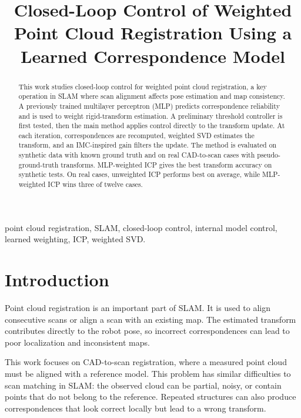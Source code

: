\documentclass[conference]{IEEEtran}
\begin{document}
\title{Closed-Loop Control of Weighted Point Cloud Registration Using a Learned Correspondence Model}

\author{
}

\maketitle

\begin{abstract}
This work studies closed-loop control for weighted point cloud registration, a key operation in SLAM where scan alignment affects pose estimation and map consistency. A previously trained multilayer perceptron (MLP) predicts correspondence reliability and is used to weight rigid-transform estimation. A preliminary threshold controller is first tested, then the main method applies control directly to the transform update. At each iteration, correspondences are recomputed, weighted SVD estimates the transform, and an IMC-inspired gain filters the update. The method is evaluated on synthetic data with known ground truth and on real CAD-to-scan cases with pseudo-ground-truth transforms. MLP-weighted ICP gives the best transform accuracy on synthetic tests. On real cases, unweighted ICP performs best on average, while MLP-weighted ICP wins three of twelve cases.
\end{abstract}

\begin{IEEEkeywords}
point cloud registration, SLAM, closed-loop control, internal model control, learned weighting, ICP, weighted SVD.
\end{IEEEkeywords}

\section{Introduction}
\label{sec:introduction}

Point cloud registration is an important part of SLAM. It is used to align consecutive scans or align a scan with an existing map. The estimated transform contributes directly to the robot pose, so incorrect correspondences can lead to poor localization and inconsistent maps.

This work focuses on CAD-to-scan registration, where a measured point cloud must be aligned with a reference model. This problem has similar difficulties to scan matching in SLAM: the observed cloud can be partial, noisy, or contain points that do not belong to the reference. Repeated structures can also produce correspondences that look correct locally but lead to a wrong transform.
\end{document}
